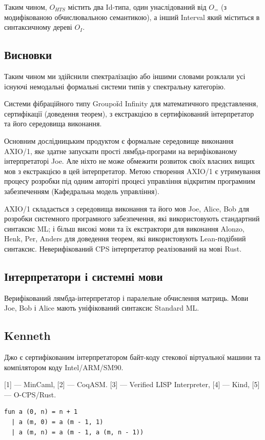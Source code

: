 Таким чином,
$O_{HTS}$ містить два Id-типа, один унаслідований від $O_=$ (з модифікованою
обчислювальною семантикою), а інший Interval який міститься в синтаксичному дереві $O_I$.

\newpage
\subsection{Висновки}

Таким чином ми здійснили спектралізацію або іншими словами розклали усі
існуючі немодальні формальні системи типів у спектральну категорію.

Системи фібраційного типу Groupoїd Infinity для математичного представлення,
сертифікації (доведення теорем), з екстракцією в сертифікований інтерпретатор
та його середовища виконання.

Основним дослідницьким продуктом є формальне середовище виконання AXIO/1,
яке здатне запускати прості лямбда-програми на верифікованому інтерпретаторі Joe.
Але ніхто не може обмежити розвиток своїх власних вищих мов з екстракцією в цей інтерпретатор.
Метою створення AXIO/1 є утримування процесу розробки під одним авторіті процесі управління
відкритим програмним забезпеченням (Кафедральна модель управління).

AXIO/1 складається з середовища виконання та його мов Joe, Alice, Bob для розробки системного
програмного забезпечення, які використовують стандартний синтаксис ML; і більш високі
мови та їх екстрактори для виконання Alonzo, Henk, Per, Anders для доведення теорем,
які використовують Lean-подібний синтаксис. Неверифікований CPS інтерпретатор реалізований
на мові Rust.

\newpage
\subsection*{Інтерпретатори і системні мови}
Верифікований лямбда-інтерпретатор і паралельне обчислення матриць. Мови Joe,
Bob і Alice мають уніфікований синтаксис Standard ML.

\subsection*{Kenneth}
Джо є сертифікованим інтерпретатором байт-коду стекової віртуальної машини
та компілятором коду Intel/ARM/SM90.

[1] — MinCaml, [2] — CoqASM. [3] — Verified LISP Interpreter, [4] — Kind, [5] — O-CPS/Rust.

\begin{lstlisting}[mathescape=true]
fun a (0, n) = n + 1
  | a (m, 0) = a (m - 1, 1)
  | a (m, n) = a (m - 1, a (m, n - 1))
\end{lstlisting}

